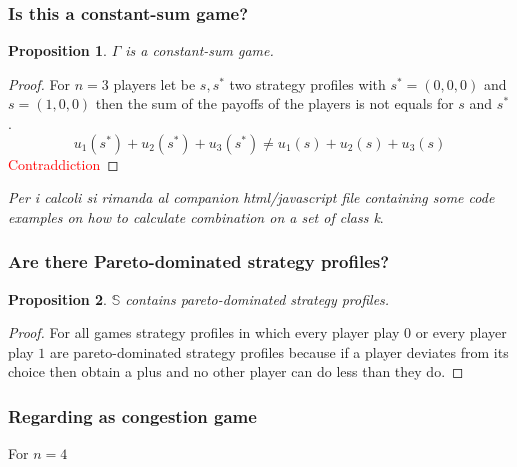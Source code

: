 \documentclass{article}
\newtheorem{prop}{Proposition}
\begin{document}
\subsubsection{Is this a constant-sum game?}
\begin{prop}
	$\Gamma$ is a constant-sum game. 
\end{prop}
\begin{proof}
	For $n=3$ players let be $s,s^*$ two strategy profiles with $s^*=(0,0,0)$ and $s=(1,0,0)$ then the sum of the payoffs of the players is not equals for $s$ and $s^*$.
	\[
	 u_1(s^*)+u_2(s^*)+u_3(s^*) \ne u_1(s)+u_2(s)+u_3(s)
	\]
	\textcolor{red}{Contraddiction}
\end{proof}

\emph{Per i calcoli si rimanda al companion html/javascript file containing some code examples on how to calculate combination on a set of class k}.

\subsubsection{Are there Pareto-dominated strategy profiles?}
\begin{prop}
	$\mathbb{S}$ contains pareto-dominated strategy profiles.
\end{prop}
\begin{proof}
	For all games strategy profiles in which every player play $0$ or every player play $1$ are pareto-dominated strategy profiles because if a player deviates from its choice then obtain a plus and no other player can do less than they do.
\end{proof}

\subsubsection{Regarding as congestion game}

For $n=4$
\end{document}
